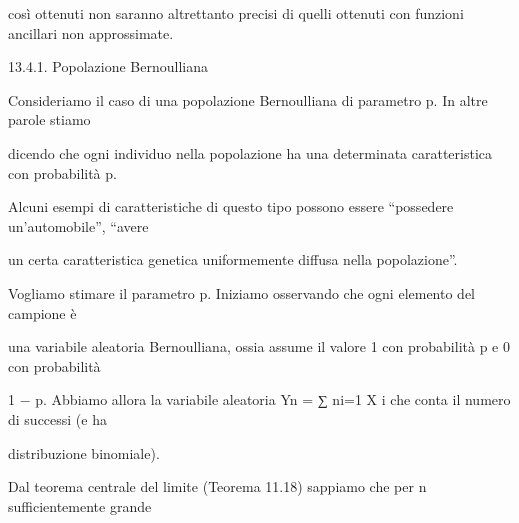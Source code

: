 \documentclass[a4paper,portrait,12pt]{article}
\begin{document}
\begin{flushleft}
così ottenuti non saranno altrettanto precisi di quelli ottenuti con funzioni ancillari non approssimate.
\end{flushleft}





\begin{flushleft}
13.4.1. Popolazione Bernoulliana
\end{flushleft}


\begin{flushleft}
Consideriamo il caso di una popolazione Bernoulliana di parametro p. In altre parole stiamo
\end{flushleft}


\begin{flushleft}
dicendo che ogni individuo nella popolazione ha una determinata caratteristica con probabilit\`{a} p.
\end{flushleft}


\begin{flushleft}
Alcuni esempi di caratteristiche di questo tipo possono essere {``}possedere un'automobile'', {``}avere
\end{flushleft}


\begin{flushleft}
un certa caratteristica genetica uniformemente diffusa nella popolazione''.
\end{flushleft}


\begin{flushleft}
Vogliamo stimare il parametro p. Iniziamo osservando che ogni elemento del campione \`{e}
\end{flushleft}


\begin{flushleft}
una variabile aleatoria Bernoulliana, ossia assume il valore 1 con probabilit\`{a} p e 0 con probabilit\`{a}
\end{flushleft}


\begin{flushleft}
1 $-$ p. Abbiamo allora la variabile aleatoria Yn = ∑ ni=1 X i che conta il numero di successi (e ha
\end{flushleft}


\begin{flushleft}
distribuzione binomiale).
\end{flushleft}


\begin{flushleft}
Dal teorema centrale del limite (Teorema 11.18) sappiamo che per n sufficientemente grande
\end{flushleft}
\end{document}
